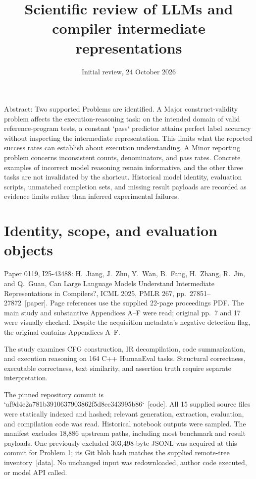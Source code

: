 \documentclass[10pt]{article}
\title{Scientific review of LLMs and compiler intermediate representations}
\author{}
\date{Initial review, 24 October 2026}
\begin{document}
\maketitle
Abstract: Two supported Problems are identified. A Major construct-validity problem affects the execution-reasoning task: on the intended domain of valid reference-program tests, a constant `pass` predictor attains perfect label accuracy without inspecting the intermediate representation. This limits what the reported success rates can establish about execution understanding. A Minor reporting problem concerns inconsistent counts, denominators, and pass rates. Concrete examples of incorrect model reasoning remain informative, and the other three tasks are not invalidated by the shortcut. Historical model identity, evaluation scripts, unmatched completion sets, and missing result payloads are recorded as evidence limits rather than inferred experimental failures.\par
\section*{Identity, scope, and evaluation objects}
Paper 0119, I25-43488: H. Jiang, J. Zhu, Y. Wan, B. Fang, H. Zhang, R. Jin, and Q. Guan, Can Large Language Models Understand Intermediate Representations in Compilers?, ICML 2025, PMLR 267, pp. 27851–27872 [paper]. Page references use the supplied 22-page proceedings PDF. The main study and substantive Appendices A–F were read; original pp. 7 and 17 were visually checked. Despite the acquisition metadata’s negative detection flag, the original contains Appendices A–F.\par
The study examines CFG construction, IR decompilation, code summarization, and execution reasoning on 164 C++ HumanEval tasks. Structural correctness, executable correctness, text similarity, and assertion truth require separate interpretation.\par
The pinned repository commit is `af9d4e2a781b3910637903862f5d8ee343995b86` [code]. All 15 supplied source files were statically indexed and hashed; relevant generation, extraction, evaluation, and compilation code was read. Historical notebook outputs were sampled. The manifest excludes 18,886 upstream paths, including most benchmark and result payloads. One previously excluded 303,498-byte JSONL was acquired at this commit for Problem 1; its Git blob hash matches the supplied remote-tree inventory [data]. No unchanged input was redownloaded, author code executed, or model API called.\par
\end{document}
